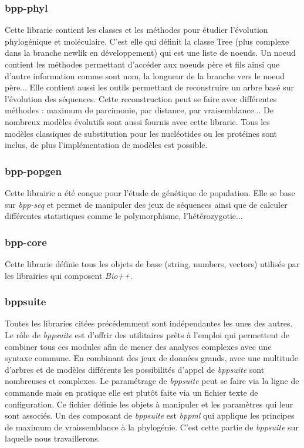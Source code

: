 	\subsubsection*{bpp-phyl}
	Cette librarie contient les classes et les méthodes pour étudier l'évolution phylogénique et moléculaire. C'est elle qui définit la classe Tree (plus complexe dans la branche newlik en développement) qui est une liste de noeuds. Un noeud contient les méthodes permettant d'accéder aux noeuds père et fils ainsi que d'autre information comme sont nom, la longueur de la branche vers le noeud père...
	Elle contient aussi les outils permettant de reconstruire un arbre basé sur l'évolution des séquences. Cette reconstruction peut se faire avec différentes méthodes : maximum de parcimonie, par distance, par vraisemblance...
	De nombreux modèles évolutifs sont aussi fournis avec cette librarie. Tous les modèles classiques de substitution pour les nucléotides ou les protéines sont inclus, de plus l'implémentation de modèles est possible.
	\subsubsection*{bpp-popgen}
	Cette librairie a été conçue pour l'étude de génétique de population. Elle se base sur \textit{bpp-seq} et permet de manipuler des jeux de séquences ainsi que de calculer différentes statistiques comme le polymorphisme, l'hétérozygotie...
	
	\subsubsection*{bpp-core}
	Cette librarie définie tous les objets de base (string, numbers, vectors) utilisés par les librairies qui composent \textit{Bio++}.
	
	\subsubsection*{bppsuite}
	Toutes les libraries citées précédemment sont indépendantes les unes des autres. Le rôle de \textit{bppsuite} est d'offrir des utilitaires prêts à l'emploi qui permettent de combiner tous ces modules afin de mener des analyses complexes avec une syntaxe commune. En combinant des jeux de données grands, avec une multitude d'arbres et de modèles différents les possibilités d'appel de \textit{bppsuite} sont nombreuses et complexes. Le paramétrage de \textit{bppsuite} peut se faire via la ligne de commande mais en pratique elle est plutôt faite via un fichier texte de configuration. Ce fichier définie les objets à manipuler et les paramètres qui leur sont associés.
	Un des composant de \textit{bppsuite} est \textit{bppml} qui applique les principes de maximum de vraissemblance à la phylogénie. C'est cette partie de \textit{bppsuite} sur laquelle nous travaillerons.
	
